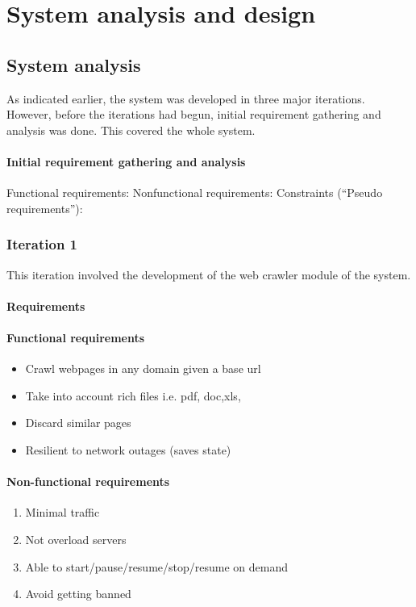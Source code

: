 \chapter{System analysis and design}
\section{System analysis}
\noindent
As indicated earlier, the system was developed in three major iterations. However, before the
iterations had begun, initial requirement gathering and analysis was done. This covered the whole
system.
\subsubsection{Initial requirement gathering and analysis}
Functional requirements:
Nonfunctional requirements:
Constraints (“Pseudo requirements”):
\subsection{Iteration 1}
This iteration involved the development of the web crawler module of the system.
\subsubsection{Requirements}
\subsubsection{Functional requirements}
\begin{itemize}
\item Crawl webpages in any domain given a base url
\item Take into account rich files i.e. pdf, doc,xls,
\item Discard similar pages
\item Resilient to network outages (saves state)
\end{itemize}
\subsubsection{Non-functional requirements}
\begin{enumerate}
\item Minimal traffic
\item Not overload servers
\item Able to start/pause/resume/stop/resume on demand
\item Avoid getting banned
\end{enumerate}

